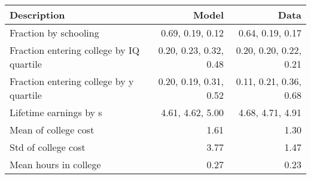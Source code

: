 \begin{tabular}{lrr}
\hline
Description & Model  & Data  \\
\hline
Fraction by schooling & 0.69, 0.19, 0.12  & 0.64, 0.19, 0.17  \\
Fraction entering college by IQ quartile & 0.20, 0.23, 0.32, 0.48  & 0.20, 0.20, 0.22, 0.21  \\
Fraction entering college by y quartile & 0.20, 0.19, 0.31, 0.52  & 0.11, 0.21, 0.36, 0.68  \\
Lifetime earnings by s & 4.61, 4.62, 5.00  & 4.68, 4.71, 4.91  \\
Mean of college cost & 1.61  & 1.30  \\
Std of college cost & 3.77  & 1.47  \\
Mean hours in college & 0.27  & 0.23  \\
\hline
\end{tabular}%
